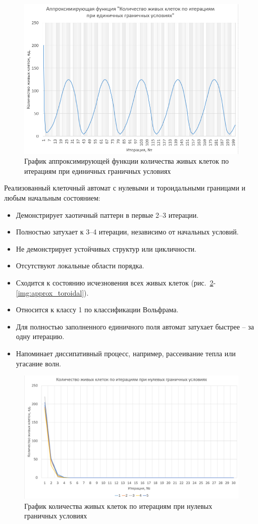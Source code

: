 \documentclass[a4paper, final]{article}
\begin{document}
\begin{figure}[h!]
  \centering
  \includegraphics[width=0.8\linewidth]{approx_one.png}
  \caption{График аппроксимирующей функции количества живых клеток по итерациям при единичных граничных условиях}
  \label{img:approx_one}
\end{figure}

Реализованный клеточный автомат с нулевыми и тороидальными границами и любым начальным состоянием:
\begin{itemize}
  \item Демонстрирует хаотичный паттерн в первые 2–3 итерации.
  \item Полностью затухает к 3–4 итерации, независимо от начальных условий.
  \item Не демонстрирует устойчивых структур или цикличности.
  \item Отсутствуют локальные области порядка.
  \item Сходится к состоянию исчезновения всех живых клеток (рис.~\ref{img:graph_zero}-\ref{img:approx_toroidal}).
  \item Относится к классу 1 по классификации Вольфрама.
  \item Для полностью заполненного единичного поля автомат затухает быстрее -- за одну итерацию.
  \item Напоминает диссипативный процесс, например, рассеивание тепла или угасание волн.
\end{itemize}

\begin{figure}[h!]
  \centering
  \includegraphics[width=0.8\linewidth]{graph_zero.png}
  \caption{График количества живых клеток по итерациям при нулевых граничных условиях}
  \label{img:graph_zero}
\end{figure}
\end{document}
